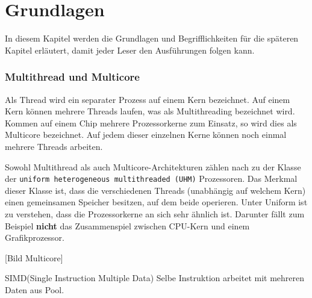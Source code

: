 \chapter{Grundlagen}
\label{sec:Grundlagen}

In diesem Kapitel werden die Grundlagen und Begrifflichkeiten für die späteren Kapitel erläutert, damit jeder Leser den Ausführungen folgen kann.

\subsection*{Multithread und Multicore}
Als Thread wird ein separater Prozess auf einem Kern bezeichnet. Auf einem Kern können mehrere Threads laufen, was als Multithreading bezeichnet wird. Kommen auf einem Chip mehrere Prozessorkerne zum Einsatz, so wird dies als Multicore bezeichnet. Auf jedem dieser einzelnen Kerne können noch einmal mehrere Threads arbeiten.

Sowohl Multithread als auch Multicore-Architekturen zählen nach \cite{GARCIA} zu der Klasse der \texttt{uniform heterogeneous multithreaded (UHM)} Prozessoren. Das Merkmal dieser Klasse ist, dass die verschiedenen Threads (unabhängig auf welchem Kern) einen gemeinsamen Speicher besitzen, auf dem beide operieren. Unter Uniform ist zu verstehen, dass die Prozessorkerne an sich sehr ähnlich ist. Darunter fällt zum Beispiel \textbf{nicht} das Zusammenspiel zwischen CPU-Kern und einem Grafikprozessor.

[Bild Multicore]

SIMD(Single Instruction Multiple Data) Selbe Instruktion arbeitet mit mehreren Daten aus Pool.

%

